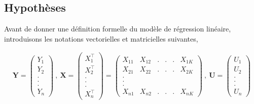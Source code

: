\subsection{Hypothèses}
Avant de donner une définition formelle du modèle de régression linéaire, introduisons les notations vectorielles et matricielles suivantes,

\begin{align*}
\mathbf{Y}=\left(
\begin{array}{c}
Y_1\\
Y_2\\
.\\
.\\
.\\
Y_n
\end{array}
\right)
\  , \
\mathbf{X}=\left(
\begin{array}{c}
X_1^\top\\
X_2^\top\\
.\\
.\\
.\\
X_n^\top
\end{array}
\right)
=
\left(
\begin{array}{cccccc}
X_{11} & X_{12}&.&.&.&X_{1K}\\
X_{21} & X_{22}&.&.&.&X_{2K}\\
.\\
.\\
.\\
X_{n1} & X_{n2}&.&.&.&X_{nK}
\end{array}
\right)
\  , \
\mathbf{U}=\left(
\begin{array}{c}
U_1\\
U_2\\
.\\
.\\
.\\
U_n
\end{array}
\right)
\end{align*}


